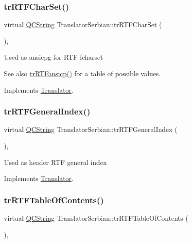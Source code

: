 \subsubsection{\texorpdfstring{trRTFCharSet()}{trRTFCharSet()}}
{\footnotesize\ttfamily virtual \mbox{\hyperlink{class_q_c_string}{Q\+C\+String}} Translator\+Serbian\+::tr\+R\+T\+F\+Char\+Set (\begin{DoxyParamCaption}{ }\end{DoxyParamCaption})\hspace{0.3cm}{\ttfamily [inline]}, {\ttfamily [virtual]}}

Used as ansicpg for R\+TF fcharset \begin{DoxySeeAlso}{See also}
\mbox{\hyperlink{class_translator_serbian_af0b81858faf43b63101a83aea2c75e76}{tr\+R\+T\+Fansicp()}} for a table of possible values. 
\end{DoxySeeAlso}


Implements \mbox{\hyperlink{class_translator_afad391f3cbfb5ce6332b7239f8e2049a}{Translator}}.

\mbox{\label{class_translator_serbian_adba17de1ae92067d5f232050c650ae80}} 
\subsubsection{\texorpdfstring{trRTFGeneralIndex()}{trRTFGeneralIndex()}}
{\footnotesize\ttfamily virtual \mbox{\hyperlink{class_q_c_string}{Q\+C\+String}} Translator\+Serbian\+::tr\+R\+T\+F\+General\+Index (\begin{DoxyParamCaption}{ }\end{DoxyParamCaption})\hspace{0.3cm}{\ttfamily [inline]}, {\ttfamily [virtual]}}

Used as header R\+TF general index 

Implements \mbox{\hyperlink{class_translator}{Translator}}.

\mbox{\label{class_translator_serbian_a55428d55c01f1c26f34d68d12a51de47}} 
\subsubsection{\texorpdfstring{trRTFTableOfContents()}{trRTFTableOfContents()}}
{\footnotesize\ttfamily virtual \mbox{\hyperlink{class_q_c_string}{Q\+C\+String}} Translator\+Serbian\+::tr\+R\+T\+F\+Table\+Of\+Contents (\begin{DoxyParamCaption}{ }\end{DoxyParamCaption})\hspace{0.3cm}{\ttfamily [inline]}, {\ttfamily [virtual]}}

